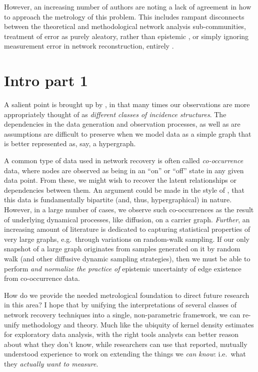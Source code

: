 \documentclass[%
	12pt,
		oneside,
		letterpaper
]{book}
\begin{document}
However, an increasing number of authors are noting a lack of agreement
in how to approach the metrology of this problem. This includes rampant
disconnects between the theoretical and methodological network analysis
sub-communities\autocite{Statisticalinferencelinks_Peel2022}, treatment
of error as purely aleatory, rather than epistemic
\autocite{Measurementerrornetwork_Wang2012}, or simply ignoring
measurement error in network reconstruction, entirely
\autocite{ReconstructingNetworksUnknown_Peixoto2018}.

\section{Intro part 1}\label{intro-part-1}

A salient point is brought up by \textcite{WhyHowWhen_Torres2021}, in
that many times our observations are more appropriately thought of as
\emph{different classes of incidence
structures}.\autocite{WhyHowWhen_Torres2021} The dependencies in the
data generation and observation processes, as well as are assumptions
are difficult to preserve when we model data as a simple graph that is
better represented as, say, a hypergraph.

A common type of data used in network recovery is often called
\emph{co-occurrence} data, where nodes are observed as being in an
``on'' or ``off'' state in any given data point. From these, we might
wish to recover the latent relationships or dependencies between them.
An argument could be made in the style of
\textcite{WhyHowWhen_Torres2021}, that this data is fundamentally
bipartite (and, thus, hypergraphical) in nature. However, in a large
number of cases, we observe such co-occurrences as the result of
underlying dynamical processes, like diffusion, on a carrier graph.
\emph{Further}, an increasing amount of literature is dedicated to
capturing statistical properties of very large graphs, e.g.~through
variations on random-walk sampling. If our only snapshot of a large
graph originates from samples generated on it by random walk (and other
diffusive dynamic sampling strategies), then we must be able to perform
\emph{and normalize the practice of} epistemic uncertainty of edge
existence from co-occurrence data.

How do we provide the needed metrological foundation to direct future
research in this area? I hope that by unifying the interpretations of
several classes of network recovery techniques into a single,
non-parametric framework, we can re-unify methodology and theory. Much
like the ubiquity of kernel density estimates for exploratory data
analysis, with the right tools analysts can better reason about what
they don't know, while researchers can use that reported, mutually
understood experience to work on extending the things we \emph{can
know}: i.e.~what they \emph{actually want to measure}.
\end{document}
